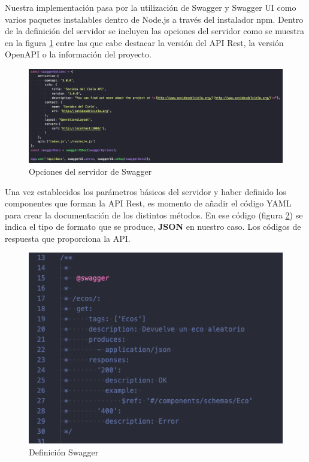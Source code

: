 Nuestra implementación pasa por la utilización de Swagger y Swagger UI como varios paquetes instalables dentro de Node.js \cite{DocumentWithSwagger} a través del instalador npm. Dentro de la definición del servidor se incluyen las opciones del servidor como se muestra en la figura \ref{fig:swagger_options} entre las que cabe destacar la versión del API Rest, la versión OpenAPI o la información del proyecto.

\begin{figure}[H]
    \centering
    \includegraphics[width=\textwidth]{include/capturas/SwaggerOptions.png}
    \caption{Opciones del servidor de Swagger}
    \label{fig:swagger_options}
\end{figure}

Una vez establecidos los parámetros básicos del servidor y haber definido los componentes que forman la API Rest, es momento de añadir el código YAML \cite{AutomaticAPIDocumentation} para crear la documentación de los distintos métodos. En ese código (figura \ref{fig:swagger_definition}) se indica el tipo de formato que se produce, \textbf{JSON} en nuestro caso. Los códigos de respuesta que proporciona la API.

\begin{figure}[h]
    \centering
    \includegraphics[scale=0.7]{include/capturas/SwaggerYAML.png}
    \caption{Definición Swagger}
    \label{fig:swagger_definition}
\end{figure}

